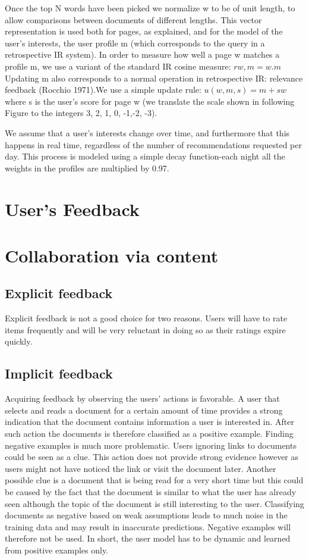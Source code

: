 Once the top N words have been picked we normalize w to be of unit length, to allow comparisons between documents of different lengths.
This vector representation is used both for pages, as explained, and for the model of the user's interests, the user profile m (which corresponds to the query in a retrospective IR system). In order to measure how well a page w matches a profile m, we use a variant of the standard IR cosine measure:
$rw,m= w.m$
Updating m also corresponds to a normal operation in retrospective IR: relevance feedback (Rocchio 1971).We use a simple update rule:
$u(w,m,s) =m+sw$
where s is the user's score for page w (we translate the scale shown in following Figure to the integers 3, 2, 1, 0, -1,-2, -3).

We assume that a user's interests change over time, and furthermore that this happens in real time, regardless of the number of recommendations requested per day. This process is modeled using a simple decay function-each night all the weights in the profiles are multiplied by 0.97.
 
\section{User's Feedback}

\section{Collaboration via content}
\subsection{Explicit feedback}
Explicit feedback is not a good choice for two reasons. Users will have to rate items frequently and will be very reluctant in doing so as their ratings expire quickly.

\subsection{Implicit feedback}
Acquiring feedback by observing the users’ actions is favorable. A user that selects and reads a document for a certain amount of time provides a strong indication that the document contains information a user is interested in. After such action the documents is therefore classified as a positive example. Finding negative examples is much more problematic. Users ignoring links to documents could be seen as a clue. This action does not provide strong evidence however as users might not have noticed the link or visit the document later. Another possible clue is a document that is being read for a very short time but this could be caused by the fact that the document is similar to what the user has already seen although the topic of the document is still interesting to the user. Classifying documents as negative based on weak assumptions leads to much noise in the training data and may result in inaccurate predictions. Negative examples will therefore not be used. In short, the user model has to be dynamic and learned from positive examples only.
